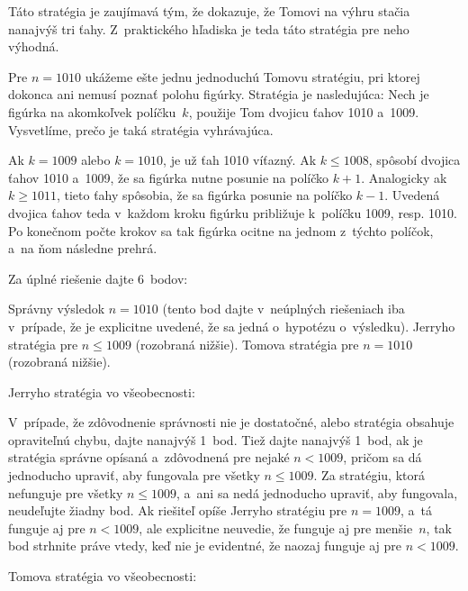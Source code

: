 {\poznamka
Táto stratégia je zaujímavá tým, že dokazuje, že
Tomovi na výhru stačia nanajvýš tri ťahy. Z~praktického hľadiska je teda
táto stratégia pre neho výhodná.


\ineres
Pre $n = 1010$ ukážeme ešte jednu jednoduchú Tomovu stratégiu,
pri ktorej dokonca ani nemusí poznať polohu
figúrky. Stratégia je nasledujúca: Nech je figúrka na akomkoľvek
políčku~$k$, použije Tom dvojicu ťahov 1010 a~1009. Vysvetlíme, prečo
je taká stratégia vyhrávajúca.

Ak $k=1009$ alebo $k=1010$, je už ťah 1010 víťazný. Ak $k\le 1008$, spôsobí dvojica
ťahov 1010 a~1009, že sa figúrka nutne posunie na políčko $k+1$.
Analogicky ak $k\ge 1011$, tieto ťahy spôsobia, že sa figúrka posunie
na políčko $k-1$. Uvedená dvojica ťahov teda v~každom kroku figúrku
približuje k~políčku 1009, resp. 1010. Po konečnom počte krokov sa tak figúrka
ocitne na jednom z~týchto políčok, a~na ňom následne prehrá.


\nobreak\medskip\petit
\BeginSchema

\Podnadpis Za úplné riešenie dajte 6~bodov:

 Správny výsledok $n = 1010$ (tento bod dajte
v~neúplných riešeniach iba v~prípade, že je explicitne uvedené, že sa jedná
o~hypotézu o~výsledku).
 Jerryho stratégia pre $n \le 1009$ (rozobraná nižšie).
 Tomova stratégia pre $n = 1010$ (rozobraná nižšie).

\Podnadpis Jerryho stratégia vo všeobecnosti:

\Item V~prípade, že zdôvodnenie správnosti nie je
dostatočné, alebo stratégia obsahuje opraviteľnú chybu, dajte nanajvýš
1~bod.
\Item Tiež dajte nanajvýš 1~bod, ak je stratégia správne
opísaná a~zdôvodnená pre nejaké $n <1009$, pričom sa dá jednoducho
upraviť, aby fungovala pre všetky $n \le 1009$.
\Item Za stratégiu, ktorá nefunguje pre všetky $n \le
1009$, a~ani sa nedá jednoducho upraviť, aby fungovala, neudeľujte žiadny bod.
\Item Ak riešiteľ opíše Jerryho stratégiu pre $n = 1009$,
a~tá funguje aj pre $n <1009$, ale explicitne neuvedie, že funguje
aj pre menšie~$n$, tak bod strhnite práve vtedy, keď nie je evidentné, že
naozaj funguje aj pre $n <1009$.

\Podnadpis Tomova stratégia vo všeobecnosti:

}
